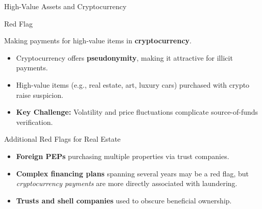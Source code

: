 \documentclass{beamer}
\begin{document}
	\begin{frame}{High-Value Assets and Cryptocurrency}
		\begin{block}{Red Flag}
			\begin{center}
				Making payments for high-value items in \textbf{cryptocurrency}.
			\end{center}
		\end{block}
		\begin{itemize}
			\item Cryptocurrency offers \textbf{pseudonymity}, making it attractive for illicit payments.
			\item High-value items (e.g., real estate, art, luxury cars) purchased with crypto raise suspicion.
			\item \textbf{Key Challenge:} Volatility and price fluctuations complicate source-of-funds verification.
		\end{itemize}
		\begin{block}{Additional Red Flags for Real Estate}
			\begin{itemize}
				\item \textbf{Foreign PEPs} purchasing multiple properties via trust companies.
				\item \textbf{Complex financing plans} spanning several years may be a red flag, but \textit{cryptocurrency payments} are more directly associated with laundering.
				\item \textbf{Trusts and shell companies} used to obscure beneficial ownership.
			\end{itemize}
		\end{block}
	\end{frame}
	
\end{document}
